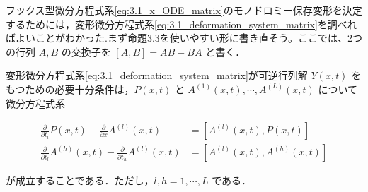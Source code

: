 フックス型微分方程式系\eqref{eq:3.1_x_ODE_matrix}のモノドロミー保存変形を決定するためには，変形微分方程式系\eqref{eq:3.1_deformation_system_matrix}を調べればよいことがわかった.まず命題3.3を使いやすい形に書き直そう。ここでは、2つの行列 $A, B$ の交換子を $[A, B] = AB - BA$ と書く．

\begin{proposition}\label{prop:3.1_compatibility}
変形微分方程式系\eqref{eq:3.1_deformation_system_matrix}が可逆行列解 $Y(x,t)$ をもつための必要十分条件は，$P(x,t)$ と $A^{(1)}(x,t), \cdots, A^{(L)}(x,t)$ について微分方程式系

\begin{align}
  \frac{\partial}{\partial t_l}P(x,t) - \frac{\partial}{\partial x}A^{(l)}(x,t) &= \left[ A^{(l)}(x,t), P(x,t) \right] \label{eq:3.1_compatibility_PA}\\
  \frac{\partial}{\partial t_l}A^{(h)}(x,t) - \frac{\partial}{\partial t_h}A^{(l)}(x,t) &= \left[ A^{(l)}(x,t), A^{(h)}(x,t) \right] \label{eq:3.1_compatibility_AA}
\end{align}

が成立することである．ただし，$l,h=1,\cdots,L$ である．
\end{proposition}


